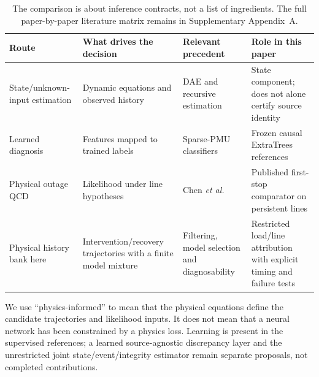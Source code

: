 \begin{table}[t]\centering\small
\caption{The comparison is about inference contracts, not a list of ingredients. The full paper-by-paper literature matrix remains in Supplementary Appendix~A.}\label{tab:literature-capability}
\begin{tabularx}{\textwidth}{@{}lXXX@{}}\toprule
Route & What drives the decision & Relevant precedent & Role in this paper\\\midrule
State/unknown-input estimation & Dynamic equations and observed history & DAE and recursive estimation & State component; does not alone certify source identity\\
Learned diagnosis & Features mapped to trained labels & Sparse-PMU classifiers & Frozen causal ExtraTrees references\\
Physical outage QCD & Likelihood under line hypotheses & Chen \emph{et al.} & Published first-stop comparator on persistent lines\\
Physical history bank here & Intervention/recovery trajectories with a finite model mixture & Filtering, model selection and diagnosability & Restricted load/line attribution with explicit timing and failure tests\\\bottomrule
\end{tabularx}\end{table}

We use ``physics-informed'' to mean that the physical equations define the candidate trajectories and likelihood inputs. It does not mean that a neural network has been constrained by a physics loss. Learning is present in the supervised references; a learned source-agnostic discrepancy layer and the unrestricted joint state/event/integrity estimator remain separate proposals, not completed contributions.
